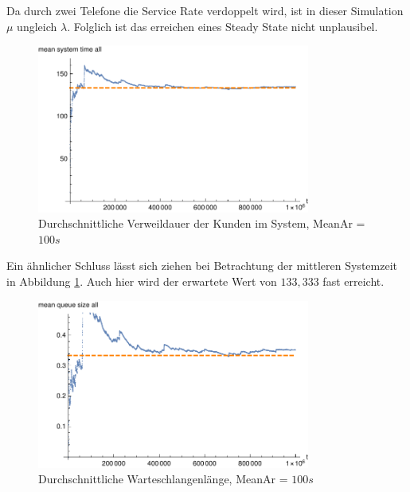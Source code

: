 Da durch zwei Telefone die Service Rate verdoppelt wird, ist in dieser Simulation $\mu$ ungleich $\lambda$. Folglich ist das erreichen eines Steady State nicht unplausibel.

\begin{figure}[htpb]
	\centering
	\includegraphics[width=0.8\textwidth]{abbildungen/2_Phone_VIP/Arrival_100_Serve_100_dur_1000000_Skip_0/MeanSystemTimeAll.pdf}
	\caption{Durchschnittliche Verweildauer der Kunden im System, MeanAr = $100s$}
	\label{fig:mean3SystemTime100}
\end{figure}

Ein ähnlicher Schluss lässt sich ziehen bei Betrachtung der mittleren Systemzeit in Abbildung \ref{fig:mean3SystemTime100}. Auch hier wird der erwartete Wert von $133,333$ fast erreicht.

\begin{figure}[htpb]
	\centering
	\includegraphics[width=0.8\textwidth]{abbildungen/2_Phone_VIP/Arrival_100_Serve_100_dur_1000000_Skip_0/MeanQueueSizeAll.pdf}
	\caption{Durchschnittliche Warteschlangenlänge, MeanAr = $100s$}
	\label{fig:mean3QueueSize100}
\end{figure}


